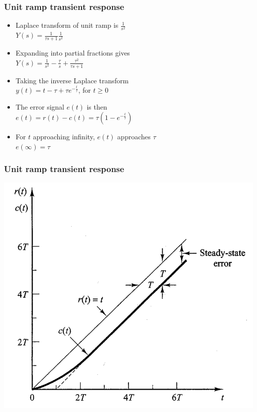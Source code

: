 \begin{frame}
\frametitle{Unit ramp transient response}
\begin{itemize}
\vspace{0.25cm}
\item Laplace transform of unit ramp is $\frac{1}{s^2}$
\vspace{0.25cm}
\\ $Y(s) = \frac{1}{\tau s +1} \frac{1}{s^2}$
\vspace{0.25cm}
\item Expanding into partial fractions gives
\vspace{0.25cm}
\\ $Y(s)= \frac{1}{s^2} - \frac{\tau}{s} + \frac{\tau^2}{\tau s +1}$
\vspace{0.25cm}
\item Taking the inverse Laplace transform 
\vspace{0.25cm}
\\ $y(t) = t -\tau + \tau e^{-\frac{t}{\tau}}$, for $t\ge 0$
\vspace{0.25cm}
\item The error signal $e(t)$ is then
\vspace{0.25cm}
\\ $e(t)=r(t) -c(t) = \tau(1-e^{-\frac{t}{\tau}})$
\vspace{0.25cm}
\item For $t$ approaching infinity, $e(t)$ approaches $\tau$
\vspace{0.25cm}
\\ $e(\infty) = \tau$
\end {itemize}
\end{frame}

\begin{frame}
\frametitle{Unit ramp transient response}
\includegraphics[width=0.8\linewidth]{Afbeelding4}
\end{frame}


